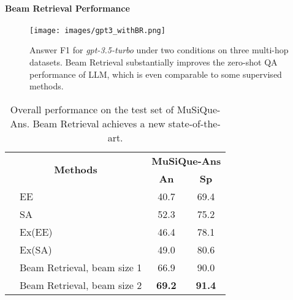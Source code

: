 \documentclass[10.5pt]{article}
\begin{document}
\paragraph{Beam Retrieval Performance}
\begin{figure}[htb]
  \centering
  \texttt{[image: images/gpt3\_withBR.png]}
  \caption{Answer F1 for \emph{gpt-3.5-turbo} under two conditions on three multi-hop datasets. Beam Retrieval substantially improves the zero-shot QA performance of LLM, which is even comparable to some supervised methods.}
  \label{fig:exp_gpt3}
\end{figure}

\begin{table}[h]
\centering
\begin{tabular}{cl|cc}
\hline
\multicolumn{2}{c|}{\multirow{2}{*}{\textbf{Methods}}} & \multicolumn{2}{c}{\textbf{MuSiQue-Ans}} \\ \cline{3-4} 
\multicolumn{2}{c|}{}                             & \textbf{An}    & \textbf{Sp}    \\ \hline
                    & EE \cite{musique}               
                    & 40.7 & 69.4   \\
                   & SA \cite{musique}               
                    & 52.3 & 75.2         \\
& Ex(EE) \cite{musique}               
                    & 46.4 & 78.1      \\
& Ex(SA) \cite{musique}                
                    & 49.0 & 80.6     \\
& Beam Retrieval, beam size 1 & 66.9 & 90.0       \\ 
                    & Beam Retrieval, beam size 2 & \textbf{69.2} & \textbf{91.4}       \\ 
                    \hline
\end{tabular}
\caption{Overall performance on the test set of MuSiQue-Ans. Beam Retrieval achieves a new state-of-the-art.}
\label{tab:total_performance_musique}
\end{table}
\end{document}
